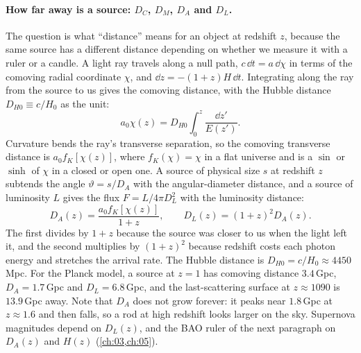 \paragraph{How far away is a source: $D_C$, $D_M$, $D_A$ and $D_L$.}
The question is what ``distance'' means for an object at redshift $z$, because the same source has a different distance depending on whether we measure it with a ruler or a candle. A light ray travels along a null path, $c\,\dd t=a\,\dd\chi$ in terms of the comoving radial coordinate $\chi$, and $\dd z=-(1+z)H\,\dd t$. Integrating along the ray from the source to us gives the comoving distance, with the Hubble distance $D_{H0}\equiv c/H_0$ as the unit:
\begin{equation*}
a_0\chi(z)=D_{H0}\int_0^{z}\frac{\dd z'}{E(z')} .
\end{equation*}
Curvature bends the ray's transverse separation, so the comoving transverse distance is $a_0f_K[\chi(z)]$, where $f_K(\chi)=\chi$ in a flat universe and is a $\sin$ or $\sinh$ of $\chi$ in a closed or open one. A source of physical size $s$ at redshift $z$ subtends the angle $\vartheta=s/D_A$ with the angular-diameter distance, and a source of luminosity $L$ gives the flux $F=L/4\pi D_L^2$ with the luminosity distance:
\begin{equation*}
D_A(z)=\frac{a_0f_K[\chi(z)]}{1+z},
\qquad
D_L(z)=(1+z)^2D_A(z).
\end{equation*}
The first divides by $1+z$ because the source was closer to us when the light left it, and the second multiplies by $(1+z)^2$ because redshift costs each photon energy and stretches the arrival rate. The Hubble distance is $D_{H0}=c/H_0\approx4450$\,Mpc. For the Planck model, a source at $z=1$ has comoving distance $3.4$\,Gpc, $D_A=1.7$\,Gpc and $D_L=6.8$\,Gpc, and the last-scattering surface at $z\approx1090$ is $13.9$\,Gpc away. Note that $D_A$ does not grow forever: it peaks near $1.8$\,Gpc at $z\approx1.6$ and then falls, so a rod at high redshift looks larger on the sky. Supernova magnitudes depend on $D_L(z)$, and the BAO ruler of the next paragraph on $D_A(z)$ and $H(z)$ (\cref{ch:03,ch:05}).

